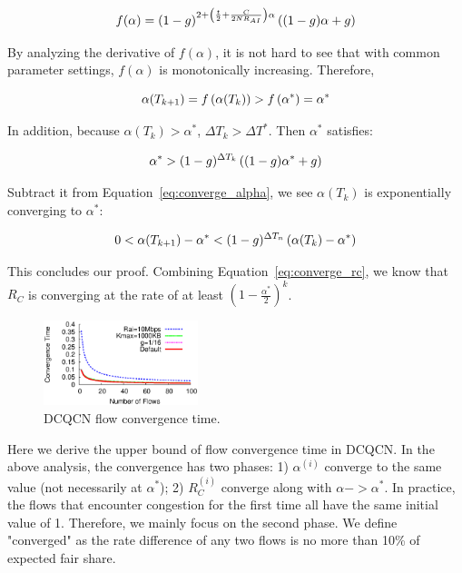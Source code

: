 \begin{equation}
\small
f(\alpha ) = {(1 - g)^{2 + \left( {\frac{t}{2} + \frac{C}{{2N{R_{AI}}}}} \right)\alpha }}\left( {(1 - g)\alpha  + g} \right)
\end{equation}

By analyzing the derivative of $f(\alpha )$, it is not hard to see that with common parameter 
settings, $f(\alpha )$ is monotonically increasing. Therefore, 

\begin{equation}
\small
\alpha ({T_{k + 1}}) = f\left( {\alpha ({T_k})} \right) > f\left( {{\alpha ^*}} \right) = {\alpha ^*}
\end{equation}

In addition, because $\alpha ({T_k}) > {\alpha ^*}$, $\Delta {T_k} > \Delta {T^*}$. 
Then $\alpha^{*}$ satisfies:

\begin{equation}
\small
{\alpha ^*} > {(1 - g)^{\Delta {T_k}}}\left( {(1 - g){\alpha ^*} + g} \right)
\end{equation}

Subtract it from Equation~\ref{eq:converge_alpha}, we see $\alpha ({T_k})$ is exponentially 
converging to $\alpha ^*$:

\begin{equation}
\small
0 < \alpha ({T_{k + 1}}) - {\alpha ^*} < {(1 - g)^{\Delta {T_n}}}\left( {\alpha ({T_k}) - {\alpha ^*}} \right)
\end{equation}

This concludes our proof. Combining Equation~\ref{eq:converge_rc}, we know that $R_C$ is 
converging at the rate of at least $( {1 - \frac{{{\alpha ^{*}}}}{2}} )^k$.

\begin{figure}[t]
\center
\includegraphics[width=0.4\textwidth]{figures/dcqcn_convergence_time.eps}
\caption{DCQCN flow convergence time.}
\label{fig:dcqcn_convergence_time}
\end{figure}

 Here we derive the upper bound of flow convergence time in DCQCN.
In the above analysis, the convergence has two phases: 1) $\alpha ^{(i)}$ converge to the 
same value (not necessarily at $\alpha^*$); 2) $R_C^{(i)}$ converge along with $\alpha -> \alpha^*$. 
In practice, the flows that encounter congestion for the first time all have the same initial
value of 1. Therefore, we mainly focus on the second phase. We define "converged" as the rate
difference of any two flows is no more than 10\% of expected fair share.

